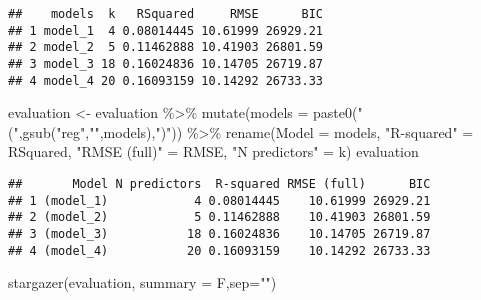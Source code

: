 \documentclass[
]{article}
\newenvironment{Shaded}{\begin{snugshade}}{\end{snugshade}}
\newcommand{\AttributeTok}[1]{\textcolor[rgb]{0.77,0.63,0.00}{#1}}
\newcommand{\FunctionTok}[1]{\textcolor[rgb]{0.00,0.00,0.00}{#1}}
\newcommand{\NormalTok}[1]{#1}
\newcommand{\OtherTok}[1]{\textcolor[rgb]{0.56,0.35,0.01}{#1}}
\newcommand{\SpecialCharTok}[1]{\textcolor[rgb]{0.00,0.00,0.00}{#1}}
\newcommand{\StringTok}[1]{\textcolor[rgb]{0.31,0.60,0.02}{#1}}
\begin{document}
\begin{verbatim}
##    models  k   RSquared     RMSE      BIC
## 1 model_1  4 0.08014445 10.61999 26929.21
## 2 model_2  5 0.11462888 10.41903 26801.59
## 3 model_3 18 0.16024836 10.14705 26719.87
## 4 model_4 20 0.16093159 10.14292 26733.33
\end{verbatim}

\begin{Shaded}
\begin{Highlighting}[]
\NormalTok{evaluation }\OtherTok{\textless{}{-}}\NormalTok{ evaluation }\SpecialCharTok{\%\textgreater{}\%}
  \FunctionTok{mutate}\NormalTok{(}\AttributeTok{models =} \FunctionTok{paste0}\NormalTok{(}\StringTok{"("}\NormalTok{,}\FunctionTok{gsub}\NormalTok{(}\StringTok{"reg"}\NormalTok{,}\StringTok{""}\NormalTok{,models),}\StringTok{")"}\NormalTok{)) }\SpecialCharTok{\%\textgreater{}\%}
  \FunctionTok{rename}\NormalTok{(}\AttributeTok{Model =}\NormalTok{ models, }\StringTok{"R{-}squared"} \OtherTok{=}\NormalTok{ RSquared, }\StringTok{"RMSE (full)"} \OtherTok{=}\NormalTok{ RMSE, }\StringTok{"N predictors"} \OtherTok{=}\NormalTok{ k)}
\NormalTok{evaluation}
\end{Highlighting}
\end{Shaded}

\begin{verbatim}
##       Model N predictors  R-squared RMSE (full)      BIC
## 1 (model_1)            4 0.08014445    10.61999 26929.21
## 2 (model_2)            5 0.11462888    10.41903 26801.59
## 3 (model_3)           18 0.16024836    10.14705 26719.87
## 4 (model_4)           20 0.16093159    10.14292 26733.33
\end{verbatim}

\begin{Shaded}
\begin{Highlighting}[]
\FunctionTok{stargazer}\NormalTok{(evaluation, }\AttributeTok{summary =}\NormalTok{ F,}\AttributeTok{sep=}\StringTok{""}\NormalTok{)}
\end{Highlighting}
\end{Shaded}
\end{document}
